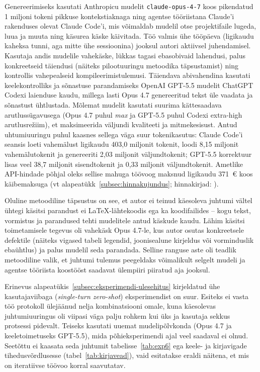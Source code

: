 Genereerimiseks kasutati Anthropicu mudelit \texttt{claude-opus-4-7} koos pikendatud 1 miljoni tokeni pikkuse kontekstiaknaga ning agentse tööriistana Claude'i rakenduses olevat Claude Code'i, mis võimaldab mudelil otse projektifaile lugeda, luua ja muuta ning käsurea käske käivitada. Töö valmis ühe tööpäeva (ligikaudu kaheksa tunni, aga mitte ühe sessioonina) jooksul autori aktiivsel juhendamisel. Kasutaja andis mudelile vahekäske, lükkas tagasi ebasobivaid lahendusi, palus konkreetseid täiendusi (näiteks pilootuuringu metoodika täpsustamist) ning kontrollis vahepealseid kompileerimistulemusi. Täiendava abivahendina kasutati keelekontrolliks ja sõnastuse parandamiseks OpenAI GPT-5.5 mudelit ChatGPT Codexi laienduse kaudu, millega lasti Opus 4.7 genereeritud tekst üle vaadata ja sõnastust ühtlustada. Mõlemat mudelit kasutati suurima kättesaadava arutlussügavusega (Opus 4.7 puhul \textit{max} ja GPT-5.5 puhul Codexi {extra-high} arutlusrežiim), et maksimeerida väljundi kvaliteeti ja mitmekesisust. Antud uhtumiuuringu puhul kaasnes sellega väga suur tokenikasutus: Claude Code'i seansis loeti vahemälust ligikaudu 403,0 miljonit tokenit, loodi 8,15 miljonit vahemälutokenit ja genereeriti 2,03 miljonit väljundtokenit; GPT-5.5 korrektuur lisas veel 38,7 miljonit sisendtokenit ja 0,33 miljonit väljundtokenit. Ametlike API-hindade põhjal oleks sellise mahuga töövoog maksnud ligikaudu 371~€ koos käibemaksuga (vt alapeatükk~\ref{subsec:hinnakujundus}; hinnakirjad: \cite{anthropic2026pricing, openai2026pricing}).

Oluline metoodiline täpsustus on see, et autor ei teinud käesoleva juhtumi vältel ühtegi käsitsi parandust ei \LaTeX{}-lähtekoodis ega ka koodifailides -- kogu tekst, vormistus ja parandused tehti mudelitele antud käskude kaudu. Lähim käsitsi toimetamisele tegevus oli vahekäsk Opus 4.7-le, kus autor osutas konkreetsele defektile (näiteks vigased tabeli legendid, joonisealune kirjeldus või vorminduslik ebaühtlus) ja palus mudelil seda parandada. Selline ranguse aste oli teadlik metoodiline valik, et juhtumi tulemus peegeldaks võimalikult selgelt mudeli ja agentse tööriista koostööst saadavat ülempiiri piiratud aja jooksul.

Erinevus alapeatükis~\ref{subsec:eksperimendi-ulesehitus} kirjeldatud ühe kasutajaviibaga (\textit{single-turn zero-shot}) eksperimendist on suur. Esiteks ei vasta töö protokoll ülejäänud nelja kombinatsiooni omale, kuna käesolevas juhtumiuuringus oli viipasi väga palju rohkem kui üks ja kasutaja sekkus protsessi pidevalt. Teiseks kasutati uuemat mudelipõlvkonda (Opus 4.7 ja keeletoimetuseks GPT-5.5), mida põhieksperimendi ajal veel saadaval ei olnud. Seetõttu ei kaasata seda juhtumit tabelisse~\ref{tab:exp6} ega keele- ja kirjavigade tihedusvõrdlusesse (tabel~\ref{tab:kirjavead}), vaid esitatakse eraldi näitena, et mis on iteratiivse töövoo korral saavutatav.


